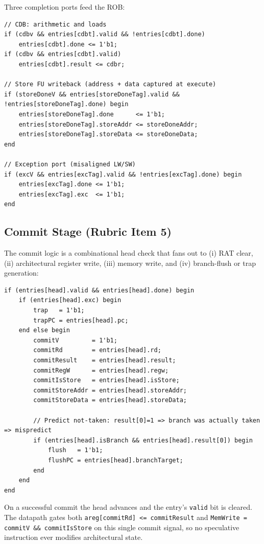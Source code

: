 \documentclass[11pt]{article}
\begin{document}
Three completion ports feed the ROB:

\begin{lstlisting}[style=verilog, caption=ROB writeback from CDB / store FU / exception]
// CDB: arithmetic and loads
if (cdbv && entries[cdbt].valid && !entries[cdbt].done)
    entries[cdbt].done <= 1'b1;
if (cdbv && entries[cdbt].valid)
    entries[cdbt].result <= cdbr;

// Store FU writeback (address + data captured at execute)
if (storeDoneV && entries[storeDoneTag].valid && !entries[storeDoneTag].done) begin
    entries[storeDoneTag].done      <= 1'b1;
    entries[storeDoneTag].storeAddr <= storeDoneAddr;
    entries[storeDoneTag].storeData <= storeDoneData;
end

// Exception port (misaligned LW/SW)
if (excV && entries[excTag].valid && !entries[excTag].done) begin
    entries[excTag].done <= 1'b1;
    entries[excTag].exc  <= 1'b1;
end
\end{lstlisting}

\subsection{Commit Stage (Rubric Item 5)}

The commit logic is a combinational head check that fans out to (i) RAT
clear, (ii) architectural register write, (iii) memory write, and (iv)
branch-flush or trap generation:

\begin{lstlisting}[style=verilog, caption=ROB commit logic]
if (entries[head].valid && entries[head].done) begin
    if (entries[head].exc) begin
        trap   = 1'b1;
        trapPC = entries[head].pc;
    end else begin
        commitV         = 1'b1;
        commitRd        = entries[head].rd;
        commitResult    = entries[head].result;
        commitRegW      = entries[head].regw;
        commitIsStore   = entries[head].isStore;
        commitStoreAddr = entries[head].storeAddr;
        commitStoreData = entries[head].storeData;

        // Predict not-taken: result[0]=1 => branch was actually taken => mispredict
        if (entries[head].isBranch && entries[head].result[0]) begin
            flush   = 1'b1;
            flushPC = entries[head].branchTarget;
        end
    end
end
\end{lstlisting}

On a successful commit the head advances and the entry's \texttt{valid} bit is
cleared. The datapath gates both \texttt{areg[commitRd] <= commitResult} and
\texttt{MemWrite = commitV \&\& commitIsStore} on this single commit signal, so
no speculative instruction ever modifies architectural state.
\end{document}

